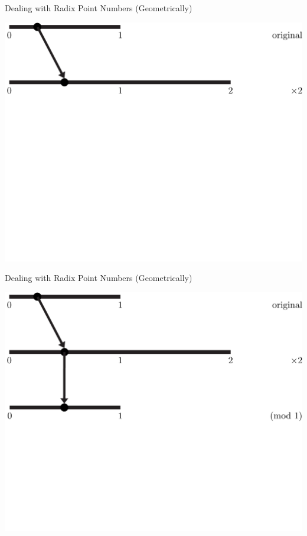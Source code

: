 \documentclass{beamer}
\begin{document}
\begin{frame}{Dealing with Radix Point Numbers (Geometrically)}
  \begin{example}
    \includegraphics[width=\textwidth,height=0.75\textheight]{images/Binary/2}
  \end{example}
\end{frame}

\begin{frame}{Dealing with Radix Point Numbers (Geometrically)}
  \begin{example}
    \includegraphics[width=\textwidth,height=0.75\textheight]{images/Binary/3}
  \end{example}
\end{frame}
\end{document}
